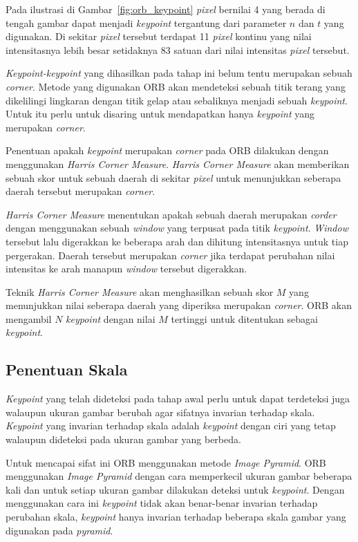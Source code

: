 Pada ilustrasi di Gambar~\ref{fig:orb_keypoint} \textit{pixel} bernilai 4 yang berada di tengah gambar dapat menjadi \textit{keypoint} tergantung dari parameter $n$ dan $t$ yang digunakan. Di sekitar \textit{pixel} tersebut terdapat 11 \textit{pixel} kontinu yang nilai intensitasnya lebih besar setidaknya 83 satuan dari nilai intensitas \textit{pixel} tersebut.

\textit{Keypoint-keypoint} yang dihasilkan pada tahap ini belum tentu merupakan sebuah \textit{corner}. Metode yang digunakan ORB akan mendeteksi sebuah titik terang yang dikelilingi lingkaran dengan titik gelap atau sebaliknya menjadi sebuah \textit{keypoint}. Untuk itu perlu untuk disaring untuk mendapatkan hanya \textit{keypoint} yang merupakan \textit{corner}. 

Penentuan apakah \textit{keypoint} merupakan \textit{corner} pada ORB dilakukan dengan menggunakan \textit{Harris Corner Measure}. \textit{Harris Corner Measure} akan memberikan sebuah skor untuk sebuah daerah di sekitar \textit{pixel} untuk menunjukkan seberapa daerah tersebut merupakan \textit{corner}. 

\textit{Harris Corner Measure} menentukan apakah sebuah daerah merupakan \textit{corder} dengan menggunakan sebuah \textit{window} yang terpusat pada titik \textit{keypoint}. \textit{Window} tersebut lalu digerakkan ke beberapa arah dan dihitung intensitasnya untuk tiap pergerakan. Daerah tersebut merupakan \textit{corner} jika terdapat perubahan nilai intensitas ke arah manapun \textit{window} tersebut digerakkan.

Teknik \textit{Harris Corner Measure} akan menghasilkan sebuah skor $M$ yang menunjukkan nilai seberapa daerah yang diperiksa merupakan \textit{corner}. ORB akan mengambil $N$ \textit{keypoint} dengan nilai $M$ tertinggi untuk ditentukan sebagai \textit{keypoint}.  

\subsection{Penentuan Skala}
\label{subsec:orb_skala}
\textit{Keypoint} yang telah dideteksi pada tahap awal perlu untuk dapat terdeteksi juga walaupun ukuran gambar berubah agar sifatnya invarian terhadap skala. \textit{Keypoint} yang invarian terhadap skala adalah \textit{keypoint} dengan ciri yang tetap walaupun dideteksi pada ukuran gambar yang berbeda. 

Untuk mencapai sifat ini ORB menggunakan metode \textit{Image Pyramid}. ORB menggunakan \textit{Image Pyramid} dengan cara memperkecil ukuran gambar beberapa kali dan untuk setiap ukuran gambar dilakukan deteksi untuk \textit{keypoint}. Dengan menggunakan cara ini \textit{keypoint} tidak akan benar-benar invarian terhadap perubahan skala, \textit{keypoint} hanya invarian terhadap beberapa skala gambar yang digunakan pada \textit{pyramid}.

